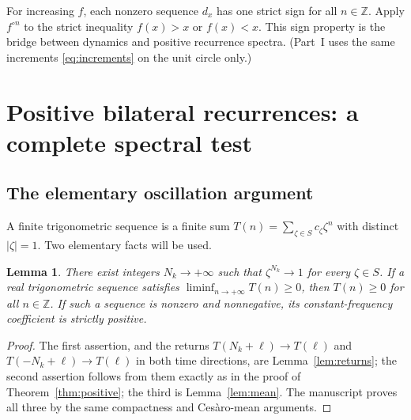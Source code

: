 \documentclass[11pt,letterpaper]{article}
\newtheorem{lemma}[theorem]{Lemma}
\theoremstyle{definition}
\theoremstyle{remark}
\newcommand{\Z}{\mathbb Z}
\newcommand{\itn}[2]{#1^{\circ #2}}
\begin{document}
For increasing $f$, each nonzero sequence $d_x$ has one strict sign for
all $n\in\Z$. Apply $\itn{f}{n}$ to the strict inequality
$f(x)>x$ or $f(x)<x$. This sign property is the bridge between dynamics
and positive recurrence spectra. (Part~I uses the same increments
\eqref{eq:increments} on the unit circle only.)

\section{Positive bilateral recurrences: a complete spectral test}
\label{nrr:sc:sec:positive}

\subsection{The elementary oscillation argument}

A finite trigonometric sequence is a finite sum
$T(n)=\sum_{\zeta\in S}c_\zeta\zeta^n$ with distinct $|\zeta|=1$.
Two elementary facts will be used.

\begin{lemma}
\label{nrr:sc:lem:trig}
There exist integers $N_k\to+\infty$ such that
$\zeta^{N_k}\to1$ for every $\zeta\in S$.
If a real trigonometric sequence satisfies
$\liminf_{n\to+\infty}T(n)\ge0$, then $T(n)\ge0$ for all $n\in\Z$.
If such a sequence is nonzero and nonnegative, its constant-frequency
coefficient is strictly positive.
\end{lemma}
\begin{proof}
The first assertion, and the returns $T(N_k+\ell)\to T(\ell)$ and
$T(-N_k+\ell)\to T(\ell)$ in both time directions, are
Lemma~\ref{lem:returns}; the second assertion follows from them exactly as in
the proof of Theorem~\ref{thm:positive}; the third is
Lemma~\ref{lem:mean}. The manuscript proves all three by the same
compactness and Ces\`aro-mean arguments.
\end{proof}
\end{document}
